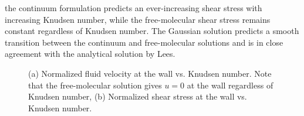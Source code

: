 \documentclass[titlepage,11pt,letterpaper]{article}
\begin{document}
the continuum formulation predicts an ever-increasing shear stress with increasing Knudsen 
number, while the free-molecular shear stress remains constant regardless of Knudsen 
number. The Gaussian solution predicts a smooth transition between the continuum and 
free-molecular solutions and is in close agreement with the analytical solution by Lees. 
%
\begin{figure}[t]
\begin{center}
\caption{ 
(a) Normalized fluid velocity at the wall vs. Knudsen number. Note that the free-molecular 
solution gives $u=0$ at the wall regardless of Knudsen number,  
(b) Normalized shear stress at the wall vs. Knudsen number.
}
\label{fig:couette-data}
\end{center}    
\end{figure}
%
\end{document}
